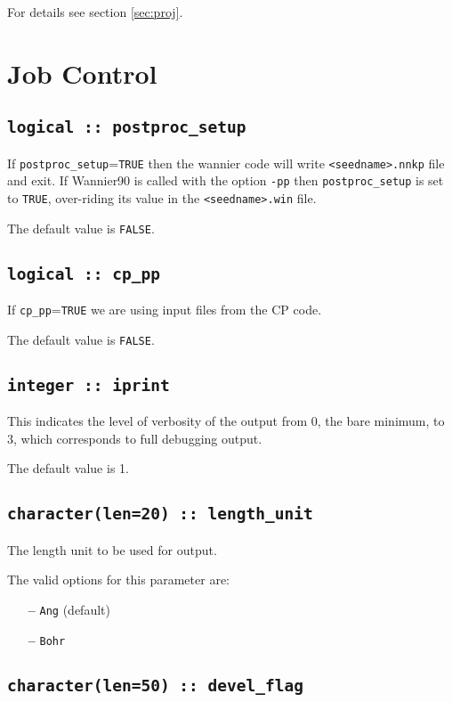 For details see section \ref{sec:proj}.

\section{Job Control}

\subsection[postproc\_setup]{\tt logical :: postproc\_setup}
If \verb#postproc_setup#=\verb#TRUE# then the wannier code will write 
 {\tt <seedname>.nnkp} file and exit.
If Wannier90 is called with the option {\tt -pp} then 
 \verb#postproc_setup# is set to 
\verb#TRUE#, over-riding its
value in the {\tt <seedname>.win} file.

The default value is \verb#FALSE#.


\subsection[cp\_pp]{\tt logical :: cp\_pp}
If \verb#cp_pp#=\verb#TRUE# we are using input files from the CP code.

The default value is \verb#FALSE#.


\subsection[iprint]{\tt integer :: iprint}

This indicates the level of verbosity of the output from 0,
the bare minimum, to 3, which corresponds to full debugging output.

The default value is 1.

\subsection[length\_unit]{\tt character(len=20) :: length\_unit}
The length unit to be used for output.

The valid options for this parameter are:
\begin{itemize}
\item[{\bf --}]  \verb#Ang# (default)
\item[{\bf --}]  \verb#Bohr#
\end{itemize}

\subsection[devel\_flag]{\tt character(len=50) :: devel\_flag}


